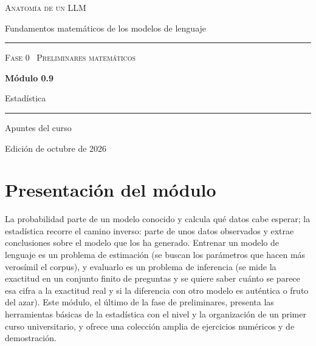 \documentclass[11pt,a4paper,twoside,openany]{book}
\begin{document}
\frontmatter
\begin{titlepage}
\centering
\vspace*{2.5cm}
{\large\scshape Anatomía de un LLM}\par
\vspace{0.4cm}
{\normalsize Fundamentos matemáticos de los modelos de lenguaje}\par
\vspace{2.2cm}
\rule{\textwidth}{0.8pt}\par\vspace{0.5cm}
{\small\scshape Fase 0 \textperiodcentered\ Preliminares matemáticos}\par\vspace{0.3cm}
{\Huge\bfseries Módulo 0.9\par}\vspace{0.3cm}
{\LARGE Estadística\par}
\vspace{0.5cm}\rule{\textwidth}{0.4pt}\par
\vspace{1.6cm}
{\large Apuntes del curso}\par
\vfill
{\small Edición de octubre de 2026}\par
\end{titlepage}

\chapter*{Presentación del módulo}

La probabilidad parte de un modelo conocido y calcula qué datos cabe esperar; la estadística recorre el camino inverso: parte de unos datos observados y extrae conclusiones sobre el modelo que los ha generado. Entrenar un modelo de lenguaje es un problema de estimación (se buscan los parámetros que hacen más verosímil el corpus), y evaluarlo es un problema de inferencia (se mide la exactitud en un conjunto finito de preguntas y se quiere saber cuánto se parece esa cifra a la exactitud real y si la diferencia con otro modelo es auténtica o fruto del azar). Este módulo, el último de la fase de preliminares, presenta las herramientas básicas de la estadística con el nivel y la organización de un primer curso universitario, y ofrece una colección amplia de ejercicios numéricos y de demostración.
\end{document}

